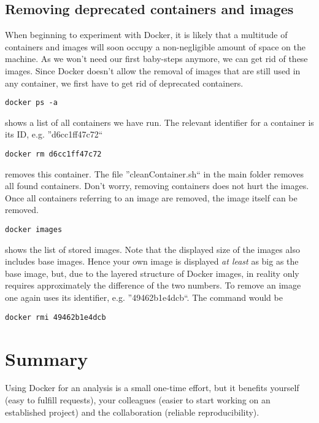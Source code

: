 \documentclass[a4paper, twoside, 11pt]{article}
\begin{document}
\subsection{Removing deprecated containers and images}
When beginning to experiment with Docker, it is likely that a multitude of containers and images will  
soon occupy a non-negligible amount of space on the machine. 
As we won't need our first baby-steps anymore, we can get rid of these images. 
Since Docker doesn't allow the removal of images that are still used in any container, 
we first have to get rid of deprecated containers. 
\begin{lstlisting}[basicstyle=\footnotesize\ttfamily,frame=single]
docker ps -a
\end{lstlisting}
shows a list of all containers we have run. 
The relevant identifier for a container is its ID, e.g. ''d6cc1ff47c72``
\begin{lstlisting}[basicstyle=\footnotesize\ttfamily,frame=single]
docker rm d6cc1ff47c72
\end{lstlisting}
removes this container. 
The file ''cleanContainer.sh`` in the main folder removes all found containers. 
Don't worry, removing containers does not hurt the images. 
Once all containers referring to an image are removed, the image itself can be removed.
\begin{lstlisting}[basicstyle=\footnotesize\ttfamily,frame=single]
docker images
\end{lstlisting}
shows the list of stored images. 
Note that the displayed size of the images also includes base images. 
Hence your own image is displayed \textit{at least} as big as the base image, 
but, due to the layered structure of Docker images, in reality only requires approximately the difference of the two numbers. 
To remove an image one again uses its identifier, e.g. ''49462b1e4dcb``. 
The command would be 
\begin{lstlisting}[basicstyle=\footnotesize\ttfamily,frame=single]
docker rmi 49462b1e4dcb
\end{lstlisting}

\section{Summary}

Using Docker for an analysis is a small one-time effort, 
but it benefits yourself (easy to fulfill requests), 
your colleagues (easier to start working on an established project) 
and the collaboration (reliable reproducibility).
\end{document}
